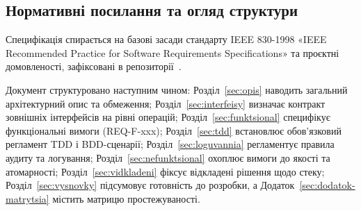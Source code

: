 \subsection{Нормативні посилання та огляд структури}\label{sec:vstup-struktura}
Специфікація спирається на базові засади стандарту IEEE 830-1998 «IEEE Recommended Practice for Software Requirements Specifications» та проєктні домовленості, зафіксовані в репозиторії~. 

Документ структуровано наступним чином: Розділ~\ref{sec:opis} наводить загальний архітектурний опис та обмеження; Розділ~\ref{sec:interfeisy} визначає контракт зовнішніх інтерфейсів на рівні операцій; Розділ~\ref{sec:funktsional} специфікує функціональні вимоги (REQ-F-xxx); Розділ~\ref{sec:tdd} встановлює обов'язковий регламент TDD і BDD-сценарії; Розділ~\ref{sec:loguvannia} регламентує правила аудиту та логування; Розділ~\ref{sec:nefunktsional} охоплює вимоги до якості та атомарності; Розділ~\ref{sec:vidkladeni} фіксує відкладені рішення щодо стеку; Розділ~\ref{sec:vysnovky} підсумовує готовність до розробки, а Додаток~\ref{sec:dodatok-matrytsia} містить матрицю простежуваності.
